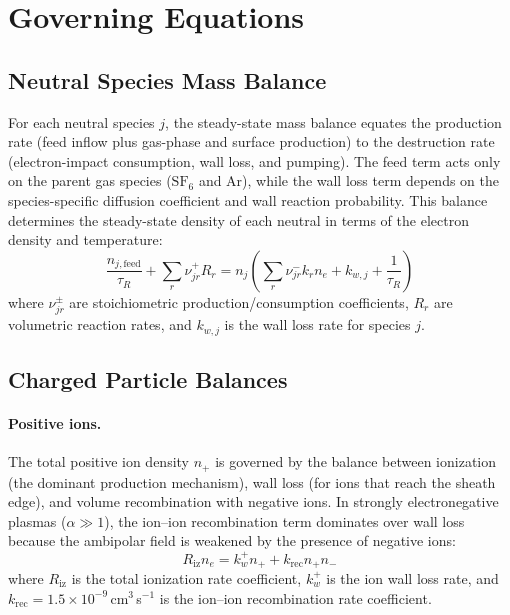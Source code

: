 \documentclass[11pt,a4paper]{report}
\newcommand{\SFsix}{\mathrm{SF}_6}
\begin{document}
\section{Governing Equations}
\label{sec:gasphase_gov}

\subsection{Neutral Species Mass Balance}
\label{sec:gasphase_neutral}

For each neutral species $j$, the steady-state mass balance equates the production rate (feed inflow plus gas-phase and surface production) to the destruction rate (electron-impact consumption, wall loss, and pumping).  The feed term acts only on the parent gas species ($\SFsix$ and Ar), while the wall loss term depends on the species-specific diffusion coefficient and wall reaction probability.  This balance determines the steady-state density of each neutral in terms of the electron density and temperature:
\begin{equation}
\boxed{\frac{n_{j,\mathrm{feed}}}{\tau_R} + \sum_r \nu_{jr}^+ R_r = n_j \left( \sum_r \nu_{jr}^- k_r n_e + k_{w,j} + \frac{1}{\tau_R} \right)}
\label{eq:gas_neutral_balance}
\end{equation}
where $\nu_{jr}^\pm$ are stoichiometric production/consumption coefficients, $R_r$ are volumetric reaction rates, and $k_{w,j}$ is the wall loss rate for species $j$.

\subsection{Charged Particle Balances}
\label{sec:gasphase_charged}

\paragraph{Positive ions.} The total positive ion density $n_+$ is governed by the balance between ionization (the dominant production mechanism), wall loss (for ions that reach the sheath edge), and volume recombination with negative ions.  In strongly electronegative plasmas ($\alpha \gg 1$), the ion--ion recombination term dominates over wall loss because the ambipolar field is weakened by the presence of negative ions:
\begin{equation}
\boxed{R_\mathrm{iz} n_e = k_w^+ n_+ + k_\mathrm{rec} n_+ n_-}
\label{eq:gas_posion}
\end{equation}
where $R_\mathrm{iz}$ is the total ionization rate coefficient, $k_w^+$ is the ion wall loss rate, and $k_\mathrm{rec} = 1.5 \times 10^{-9}$\,cm$^3$\,s$^{-1}$ is the ion--ion recombination rate coefficient.
\end{document}
